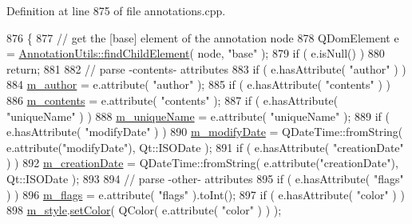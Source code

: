 Definition at line 875 of file annotations.\+cpp.


\begin{DoxyCode}
876 \{
877     \textcolor{comment}{// get the [base] element of the annotation node}
878     QDomElement e = \hyperlink{classOkular_1_1AnnotationUtils_a05b79294046a1756dd5fb120aa18b52b}{AnnotationUtils::findChildElement}( node, \textcolor{stringliteral}{"base"} );
879     \textcolor{keywordflow}{if} ( e.isNull() )
880         \textcolor{keywordflow}{return};
881 
882     \textcolor{comment}{// parse -contents- attributes}
883     \textcolor{keywordflow}{if} ( e.hasAttribute( \textcolor{stringliteral}{"author"} ) )
884         \hyperlink{classOkular_1_1AnnotationPrivate_af2997724c734cbd4dfbc6536e280d536}{m\_author} = e.attribute( \textcolor{stringliteral}{"author"} );
885     \textcolor{keywordflow}{if} ( e.hasAttribute( \textcolor{stringliteral}{"contents"} ) )
886         \hyperlink{classOkular_1_1AnnotationPrivate_ab2b69e4809035828d98a4ec701565149}{m\_contents} = e.attribute( \textcolor{stringliteral}{"contents"} );
887     \textcolor{keywordflow}{if} ( e.hasAttribute( \textcolor{stringliteral}{"uniqueName"} ) )
888         \hyperlink{classOkular_1_1AnnotationPrivate_a31b33f971130850a5b5bf67ce58ae5f1}{m\_uniqueName} = e.attribute( \textcolor{stringliteral}{"uniqueName"} );
889     \textcolor{keywordflow}{if} ( e.hasAttribute( \textcolor{stringliteral}{"modifyDate"} ) )
890         \hyperlink{classOkular_1_1AnnotationPrivate_a8663feeb255860d7c7b57b389c307b0d}{m\_modifyDate} = QDateTime::fromString( e.attribute(\textcolor{stringliteral}{"modifyDate"}), Qt::ISODate );
891     \textcolor{keywordflow}{if} ( e.hasAttribute( \textcolor{stringliteral}{"creationDate"} ) )
892         \hyperlink{classOkular_1_1AnnotationPrivate_ad4afb1827157f15bf3b5984e5f62c7a3}{m\_creationDate} = QDateTime::fromString( e.attribute(\textcolor{stringliteral}{"creationDate"}), Qt::ISODate );
893 
894     \textcolor{comment}{// parse -other- attributes}
895     \textcolor{keywordflow}{if} ( e.hasAttribute( \textcolor{stringliteral}{"flags"} ) )
896         \hyperlink{classOkular_1_1AnnotationPrivate_ae7ada31b42bb74e306f26a9126110226}{m\_flags} = e.attribute( \textcolor{stringliteral}{"flags"} ).toInt();
897     \textcolor{keywordflow}{if} ( e.hasAttribute( \textcolor{stringliteral}{"color"} ) )
898         \hyperlink{classOkular_1_1AnnotationPrivate_af49e79222d9e16611c0abd90533bc206}{m\_style}.\hyperlink{classOkular_1_1Annotation_1_1Style_a1c916cd50a0a4114188136d47943ef00}{setColor}( QColor( e.attribute( \textcolor{stringliteral}{"color"} ) ) );

\end{DoxyCode}
